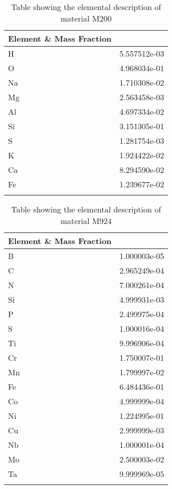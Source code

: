 \begin{centering}
\begin{longtable}[ht!]
  { p{} | p{} }
\hline
Element \& Mass Fraction\\
\hline
H &  5.557512e-03\\
O &  4.968034e-01\\
Na &  1.710308e-02\\
Mg &  2.563458e-03\\
Al &  4.697334e-02\\
Si &  3.151305e-01\\
S &  1.281754e-03\\
K &  1.924422e-02\\
Ca &  8.294590e-02\\
Fe &  1.239677e-02\\
\caption{Table showing the elemental description of material M200}
\label{table:material_M200}
\end{longtable}
\clearpage

\begin{longtable}[ht!]
{ p{} | p{} }
\hline
Element \& Mass Fraction\\
\hline
B &  1.000003e-05\\
C &  2.965249e-04\\
N &  7.000261e-04\\
Si &  4.999931e-03\\
P &  2.499975e-04\\
S &  1.000016e-04\\
Ti &  9.996906e-04\\
Cr &  1.750007e-01\\
Mn &  1.799997e-02\\
Fe &  6.484436e-01\\
Co &  4.999999e-04\\
Ni &  1.224995e-01\\
Cu &  2.999999e-03\\
Nb &  1.000001e-04\\
Mo &  2.500003e-02\\
Ta &  9.999969e-05\\
\caption{Table showing the elemental description of material M924}
\label{table:material_EppDiagPipes}
\end{longtable}


\end{centering}
